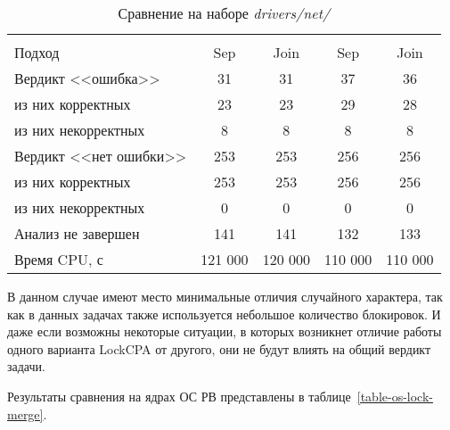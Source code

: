   \begin{table}[h]\footnotesize \centering
    \caption{Сравнение на наборе \textit{drivers/net/}}
  	\label{table-drivers-lock-merge}
    \begin{tabular}{ | l | c | c | c | c | }
      \hline
      		& 		\multicolumn{2}{c|}{\theoryraces} 	& \multicolumn{2}{c|}{\combatmode}  \\
      Подход         				& Sep 		& Join 		& Sep 		& Join   	\\ \hline
      Вердикт <<ошибка>> 			& 31   		& 31   		& 37   		& 36   		\\ 
  \hspace{0.5cm} из них корректных 	& 23 		& 23 		& 29   		& 28     	\\ 
  \hspace{0.5cm} из них некорректных & 8 		& 8 		& 8   		& 8     	\\ \hline
      Вердикт <<нет ошибки>>  		& 253    	& 253   	& 256    	& 256      	\\ 
  \hspace{0.5cm} из них корректных 	& 253 		& 253   	& 256    	& 256     	\\
  \hspace{0.5cm} из них некорректных & 0 		& 0    		& 0     	& 0  		\\ \hline
      Анализ не завершен       		& 141    	& 141   	& 132    	& 133     	\\ \hline
      Время CPU, с   				& 121 000 	& 120 000 	& 110 000 	& 110 000   \\ 
      \hline
    \end{tabular}
  \end{table}

В данном случае имеют место минимальные отличия случайного характера, так как в данных задачах также используется небольшое количество блокировок. 
И даже если возможны некоторые ситуации, в которых возникнет отличие работы одного варианта LockCPA от другого, они не будут влиять на общий вердикт задачи.

Результаты сравнения на ядрах ОС РВ представлены в таблице~\ref{table-os-lock-merge}.

